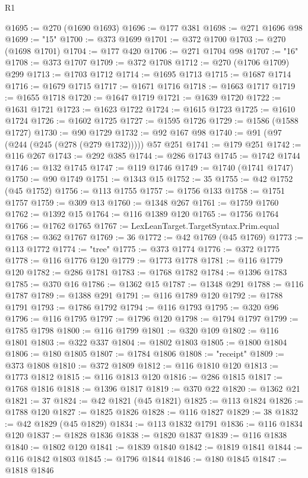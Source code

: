 \begin{lexlean}{R1}
\begin{coremodule}
@1695 := @270 (@1690 @1693)
@1696 := @177 @381
@1698 := @271 @1696 @98
@1699 := "15"
@1700 := @373 @1699
@1701 := @372 @1700
@1703 := @270 (@1698 @1701)
@1704 := @177 @420
@1706 := @271 @1704 @98
@1707 := "16"
@1708 := @373 @1707
@1709 := @372 @1708
@1712 := @270 (@1706 @1709) @299
@1713 := @1703 @1712
@1714 := @1695 @1713
@1715 := @1687 @1714
@1716 := @1679 @1715
@1717 := @1671 @1716
@1718 := @1663 @1717
@1719 := @1655 @1718
@1720 := @1647 @1719
@1721 := @1639 @1720
@1722 := @1631 @1721
@1723 := @1623 @1722
@1724 := @1615 @1723
@1725 := @1610 @1724
@1726 := @1602 @1725
@1727 := @1595 @1726
@1729 := @1586 (@1588 @1727)
@1730 := @90 @1729
@1732 := @92 @167 @98
@1740 := @91 (@97 (@244 (@245 (@278 (@279 @1732))))) @57 @251
@1741 := @179 @251
@1742 := @116 @267
@1743 := @292 @385
@1744 := @286 @1743
@1745 := @1742 @1744
@1746 := @132 @1745
@1747 := @119 @1746
@1749 := @1740 (@1741 @1747)
@1750 := @90 @1749
@1751 := @1343 @15
@1752 := 35
@1755 := @42 @1752 (@45 @1752)
@1756 := @113 @1755
@1757 := @1756 @133
@1758 := @1751 @1757
@1759 := @309 @13
@1760 := @1348 @267
@1761 := @1759 @1760
@1762 := @1392 @15
@1764 := @116 @1389 @120
@1765 := @1756 @1764
@1766 := @1762 @1765
@1767 := LexLeanTarget.TargetSyntax.Prim.equal
@1768 := @362 @1767
@1769 := 36
@1772 := @42 @1769 (@45 @1769)
@1773 := @113 @1772
@1774 := "tree"
@1775 := @373 @1774
@1776 := @372 @1775
@1778 := @116 @1776 @120
@1779 := @1773 @1778
@1781 := @116 @1779 @120
@1782 := @286 @1781
@1783 := @1768 @1782
@1784 := @1396 @1783
@1785 := @370 @16
@1786 := @1362 @15
@1787 := @1348 @291
@1788 := @116 @1787
@1789 := @1388 @291
@1791 := @116 @1789 @120
@1792 := @1788 @1791
@1793 := @1786 @1792
@1794 := @116 @1793
@1795 := @320 @96
@1796 := @116 @1795
@1797 := @1796 @120
@1798 := @1794 @1797
@1799 := @1785 @1798
@1800 := @116 @1799
@1801 := @320 @109
@1802 := @116 @1801
@1803 := @322 @337
@1804 := @1802 @1803
@1805 := @1800 @1804
@1806 := @180 @1805
@1807 := @1784 @1806
@1808 := "receipt"
@1809 := @373 @1808
@1810 := @372 @1809
@1812 := @116 @1810 @120
@1813 := @1773 @1812
@1815 := @116 @1813 @120
@1816 := @286 @1815
@1817 := @1768 @1816
@1818 := @1396 @1817
@1819 := @370 @22
@1820 := @1362 @21
@1821 := 37
@1824 := @42 @1821 (@45 @1821)
@1825 := @113 @1824
@1826 := @1788 @120
@1827 := @1825 @1826
@1828 := @116 @1827
@1829 := 38
@1832 := @42 @1829 (@45 @1829)
@1834 := @113 @1832 @1791
@1836 := @116 @1834 @120
@1837 := @1828 @1836
@1838 := @1820 @1837
@1839 := @116 @1838
@1840 := @1802 @120
@1841 := @1839 @1840
@1842 := @1819 @1841
@1844 := @116 @1842 @1803
@1845 := @1796 @1844
@1846 := @180 @1845
@1847 := @1818 @1846

\end{coremodule}
\end{lexlean}
